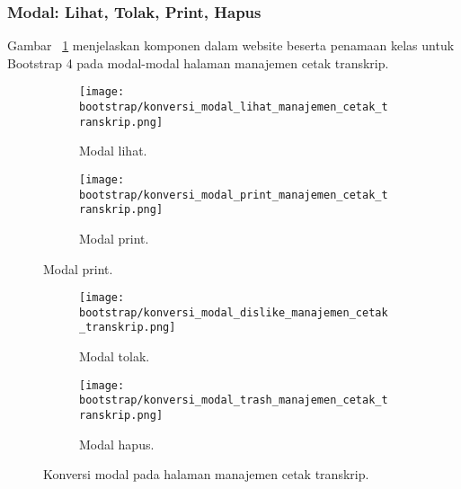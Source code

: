 \subsubsection{Modal: Lihat, Tolak, Print, Hapus}
\noindent Gambar ~\ref{fig:konversiModalManajemenCetakTranskrip} menjelaskan komponen dalam website beserta penamaan kelas untuk Bootstrap 4 pada modal-modal  halaman manajemen cetak transkrip.\\
\begin{figure} [H]	
	\centering
	\begin{subfigure}[b]{0.45\linewidth}   
		\texttt{[image: bootstrap/konversi\_modal\_lihat\_manajemen\_cetak\_transkrip.png]}
		\caption{Modal lihat.} 
	\end{subfigure}
	\begin{subfigure}[b]{0.45\linewidth} 
		\texttt{[image: bootstrap/konversi\_modal\_print\_manajemen\_cetak\_transkrip.png]}
		\caption{Modal print.} 
	\end{subfigure}
\end{figure} 
\begin{figure} [H]
	\centering
	\ContinuedFloat
	\begin{subfigure}[b]{0.45\linewidth}  
		\texttt{[image: bootstrap/konversi\_modal\_dislike\_manajemen\_cetak\_transkrip.png]}
		\caption{Modal tolak.} 
	\end{subfigure}
	\begin{subfigure}[b]{0.45\linewidth}  
		\texttt{[image: bootstrap/konversi\_modal\_trash\_manajemen\_cetak\_transkrip.png]}
		\caption{Modal hapus.} 
	\end{subfigure}
	\caption{Konversi modal pada halaman manajemen cetak transkrip.}
	\label{fig:konversiModalManajemenCetakTranskrip}
\end{figure}

